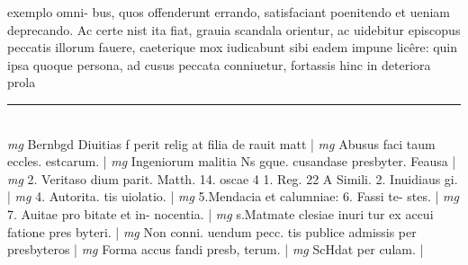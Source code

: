 \documentclass{article}
\begin{document}
\begin{pages}
exemplo omni- bus, quos offenderunt errando, satisfaciant poenitendo et ueniam deprecando. Ac certe nist ita fiat, grauia scandala orientur, ac uidebitur episcopus peccatis illorum fauere, caeterique mox iudicabunt sibi eadem impune licêre: quin ipsa quoque persona, ad cusus peccata conniuetur, fortassis hinc in deteriora prola  \pend
\vspace{0.5cm}\noindent
\vspace{0.2cm}\rule{1cm}{0.2pt}\\ 
\hspace{0.2cm}\textit{mg}
\footnotesize Bernbgd Diuitias f perit relig at filia de rauit matt 
\normalsize| 
\hspace{0.2cm}\textit{mg}
\footnotesize Abusus faci taum eccles. estcarum. 
\normalsize| 
\hspace{0.2cm}\textit{mg}
\footnotesize Ingeniorum malitia Ns gque. cusandase presbyter. Feausa 
\normalsize| 
\hspace{0.2cm}\textit{mg}
\footnotesize 2. Veritaso dium parit. Matth. 14. oscae 4 1. Reg. 22 A Simili.  2. Inuidiaus gi. 
\normalsize| 
\hspace{0.2cm}\textit{mg}
\footnotesize 4. Autorita. tis uiolatio. 
\normalsize| 
\hspace{0.2cm}\textit{mg}
\footnotesize 5.Mendacia et calumniae: 6. Fassi te- stes. 
\normalsize| 
\hspace{0.2cm}\textit{mg}
\footnotesize 7. Auitae pro bitate et in- nocentia. 
\normalsize| 
\hspace{0.2cm}\textit{mg}
\footnotesize s.Matmate clesiae inuri tur ex accui fatione pres byteri. 
\normalsize| 
\hspace{0.2cm}\textit{mg}
\footnotesize Non conni. uendum pecc. tis publice admissis per presbyteros 
\normalsize| 
\hspace{0.2cm}\textit{mg}
\footnotesize Forma accus fandi presb, terum. 
\normalsize| 
\hspace{0.2cm}\textit{mg}
\footnotesize ScHdat per culam. 
\normalsize| 

\end{pages}
\end{document}
